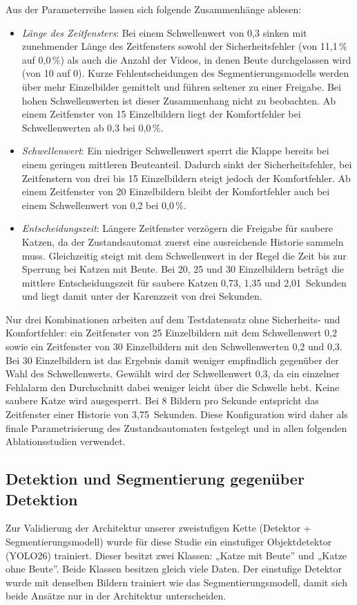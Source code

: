 Aus der Parameterreihe lassen sich folgende Zusammenhänge ablesen:

\begin{itemize}
    \item \emph{Länge des Zeitfensters}: Bei einem Schwellenwert von 0,3 sinken mit zunehmender Länge des Zeitfensters sowohl der Sicherheitsfehler (von 11,1\,\% auf 0,0\,\%) als auch die Anzahl der Videos, in denen Beute durchgelassen wird (von 10 auf 0). Kurze Fehlentscheidungen des Segmentierungsmodells werden über mehr Einzelbilder gemittelt und führen seltener zu einer Freigabe. Bei hohen Schwellenwerten ist dieser Zusammenhang nicht zu beobachten. Ab einem Zeitfenster von 15 Einzelbildern liegt der Komfortfehler bei Schwellenwerten ab 0,3 bei 0,0\,\%.
    \item \emph{Schwellenwert}: Ein niedriger Schwellenwert sperrt die Klappe bereits bei einem geringen mittleren Beuteanteil. Dadurch sinkt der Sicherheitsfehler, bei Zeitfenstern von drei bis 15 Einzelbildern steigt jedoch der Komfortfehler. Ab einem Zeitfenster von 20 Einzelbildern bleibt der Komfortfehler auch bei einem Schwellenwert von 0,2 bei 0,0\,\%.
    \item \emph{Entscheidungszeit}: Längere Zeitfenster verzögern die Freigabe für saubere Katzen, da der Zustandsautomat zuerst eine ausreichende Historie sammeln muss. Gleichzeitig steigt mit dem Schwellenwert in der Regel die Zeit bis zur Sperrung bei Katzen mit Beute. Bei 20, 25 und 30 Einzelbildern beträgt die mittlere Entscheidungszeit für saubere Katzen 0,73, 1,35 und 2,01~Sekunden und liegt damit unter der Karenzzeit von drei Sekunden.
\end{itemize}

Nur drei Kombinationen arbeiten auf dem Testdatensatz ohne Sicherheits- und Komfortfehler: ein Zeitfenster von 25 Einzelbildern mit dem Schwellenwert 0,2 sowie ein Zeitfenster von 30 Einzelbildern mit den Schwellenwerten 0,2 und 0,3. Bei 30 Einzelbildern ist das Ergebnis damit weniger empfindlich gegenüber der Wahl des Schwellenwerts. Gewählt wird der Schwellenwert 0,3, da ein einzelner Fehlalarm den Durchschnitt dabei weniger leicht über die Schwelle hebt. Keine saubere Katze wird ausgesperrt. Bei 8 Bildern pro Sekunde entspricht das Zeitfenster einer Historie von 3,75~Sekunden. Diese Konfiguration wird daher als finale Parametrisierung des Zustandsautomaten festgelegt und in allen folgenden Ablationsstudien verwendet.

\subsection{Detektion und Segmentierung gegenüber Detektion}
\label{sec:ablation_1stage}
Zur Validierung der Architektur unserer zweistufigen Kette (Detektor + Segmentierungsmodell) wurde für diese Studie ein einstufiger Objektdetektor (YOLO26) trainiert. Dieser besitzt zwei Klassen: „Katze mit Beute” und „Katze ohne Beute”. Beide Klassen besitzen gleich viele Daten. Der einstufige Detektor wurde mit denselben Bildern trainiert wie das Segmentierungsmodell, damit sich beide Ansätze nur in der Architektur unterscheiden.

